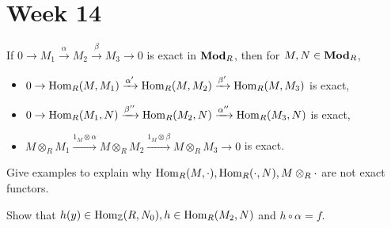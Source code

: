 
\section{Week 14}

\begin{exercise}
  If $0 \to M_1 \xrightarrow{\alpha} M_2 \xrightarrow{\beta} M_3 \to 0$
  is exact in $\mathbf{Mod}_R$, then for $M, N \in \mathbf{Mod}_R$,
  \begin{itemize}
    \item $0 \to \operatorname{Hom}_R(M, M_1) \xrightarrow{\alpha'}
      \operatorname{Hom}_R(M, M_2) \xrightarrow{\beta'} \operatorname{Hom}_R(M, M_3)$ is exact,
    \item $0 \to \operatorname{Hom}_R(M_1, N) \xrightarrow{\beta''}
      \operatorname{Hom}_R(M_2, N) \xrightarrow{\alpha''} \operatorname{Hom}_R(M_3, N)$ is exact,
    \item $M \otimes_R M_1 \xrightarrow{1_M \otimes \alpha}
      M\otimes_R M_2 \xrightarrow{1_M \otimes \beta} M\otimes_R M_3 \to 0$ is exact.
  \end{itemize}
\end{exercise}

\begin{exercise}
  Give examples to explain why $\operatorname{Hom}_R(M, \cdot), \operatorname{Hom}_R(\cdot, N), M\otimes_R \cdot$
  are not exact functors.
\end{exercise}

\begin{exercise}
  Show that $h(y) \in \operatorname{Hom}_{\mathbb{Z}}(R, N_0), h \in \operatorname{Hom}_R(M_2, N)$ and $h \circ \alpha = f$.
\end{exercise}
